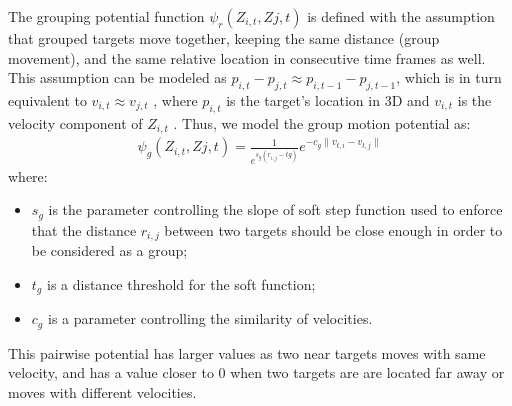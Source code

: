 The  grouping potential function $\psi_r(Z_{i,t} , Z{j,t})$  is defined with the assumption that grouped targets move together, keeping the same distance (group movement), and the same relative location in consecutive time frames as well. This assumption can be modeled as $p_{i,t} − p_{j,t} \approx p_{i,t-1} - p_{j,t-1}$, which is in turn equivalent to $v_{i,t} \approx v_{j,t}$ , where $p_{i,t}$ is the target’s location in 3D and $v_{i,t}$ is the velocity component of $Z_{i,t}$ .
Thus, we model the group motion potential as:
\begin{eqnarray} \label{eqn: group motion potential}
\psi_g(Z_{i,t} , Z{j,t}) = \frac{1}{e^{s_g(r_{i,j}-tg)} } e^{-c_g \| v_{t,i}-v_{t,j} \|} 
\end{eqnarray}
where:
\begin{itemize}
\item $s_g$ is the parameter controlling the slope of soft step function
used to enforce that the distance $r_{i,j}$ between two targets should be close enough in order to be considered as a group;
\item $t_g$ is a distance threshold for the soft function;
\item $c_g$ is a parameter controlling the similarity of velocities.
\end{itemize}
This pairwise potential has larger values as two near targets moves with same velocity, and has a value closer to $0$ when two targets are are located far away or moves with different velocities.


